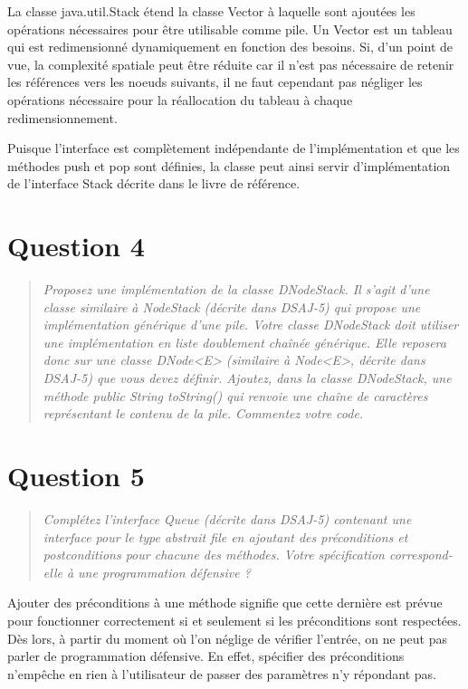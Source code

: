 \documentclass[11pt,a4paper]{article}
\begin{document}
La classe java.util.Stack étend la classe Vector à laquelle sont ajoutées les opérations nécessaires pour être utilisable comme pile. Un Vector est un tableau qui est redimensionné dynamiquement en fonction des besoins. Si, d'un point de vue, la complexité spatiale peut être réduite car il n'est pas nécessaire de retenir les références vers les noeuds suivants, il ne faut cependant pas négliger les opérations nécessaire pour la réallocation du tableau à chaque redimensionnement. 

Puisque l'interface est complètement indépendante de l'implémentation et que les méthodes push et pop sont définies, la classe peut ainsi servir d'implémentation de l'interface Stack décrite dans le livre de référence.

\section{Question 4}
\begin{quotation}
\textit{Proposez une implémentation de la classe DNodeStack. Il s’agit d’une classe
similaire à NodeStack (décrite dans DSAJ-5) qui propose une implémentation
générique d’une pile. Votre classe DNodeStack doit utiliser une implémentation en liste doublement chaînée générique. Elle reposera donc sur une classe
DNode<E> (similaire à Node<E>, décrite dans DSAJ-5) que vous devez définir.
Ajoutez, dans la classe DNodeStack, une méthode public String toString()
qui renvoie une chaîne de caractères représentant le contenu de la pile. Commentez votre code.}
\end{quotation}






\section{Question 5}
\begin{quotation}
\textit{Complétez l'interface Queue (décrite dans DSAJ-5) contenant une interface pour le type abstrait file en ajoutant des préconditions et postconditions pour chacune des méthodes. Votre spécification correspond-elle à une programmation défensive ?}
\end{quotation}




Ajouter des préconditions à une méthode signifie que cette dernière est prévue pour fonctionner correctement si et seulement si les préconditions sont respectées. Dès lors, à partir du moment où l'on néglige de vérifier l'entrée, on ne peut pas parler de programmation défensive. En effet, spécifier des préconditions n'empêche en rien à l'utilisateur de passer des paramètres n'y répondant pas.
\end{document}
